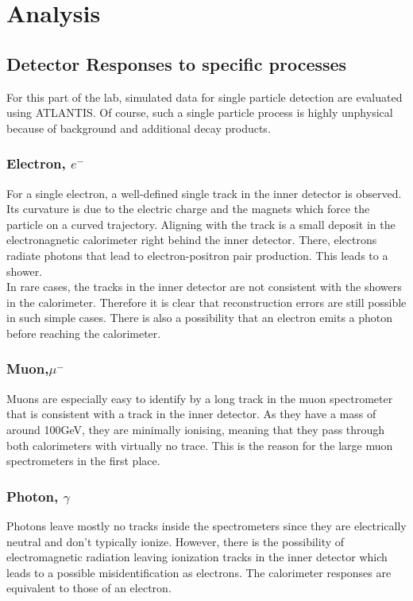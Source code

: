 \documentclass[twoside,        %
               BCOR12mm,       %
               ngerman,english, %
               fleqn,headsepline=false,footsepline=false
              ]{Vorlage/MFPREPORT}
\begin{document}
\section{Analysis}
\label{sec:analysis}
\subsection{Detector Responses to specific processes}
For this part of the lab, simulated data for single particle detection are
evaluated using ATLANTIS. Of course, such a single particle process is highly
unphysical because of background and additional decay products.
\subsubsection{Electron, $e^-$}
For a single electron, a well-defined single track in the inner detector is
observed. Its curvature is due to the electric charge and the magnets which
force the particle on a curved trajectory. Aligning with the track is a small
deposit in the electronagnetic calorimeter right behind the inner detector.
There, electrons radiate photons that lead to electron-positron pair
production. This leads to a shower.\\
In rare cases, the tracks in the inner detector are not consistent with the
showers in the calorimeter. Therefore it is clear that reconstruction errors
are still possible in such simple cases. There is also a possibility that an
electron emits a photon before reaching the calorimeter.

\subsubsection{Muon,$ \mu^-$}
Muons are especially easy to identify by a long track in the muon spectrometer
that is consistent with a track in the inner detector. As they have a mass of
around 100\;GeV, they are minimally ionising, meaning that they pass through
both calorimeters with virtually no trace. This is the reason for the large
muon spectrometers in the first place.

\subsubsection{Photon, $\gamma$}
Photons leave mostly no tracks inside the spectrometers since they are electrically
neutral and don't typically ionize. However, there is the possibility of
electromagnetic radiation leaving ionization tracks in the inner detector which
leads to a possible misidentification as electrons. The calorimeter responses
are equivalent to those of an electron.
\end{document}
